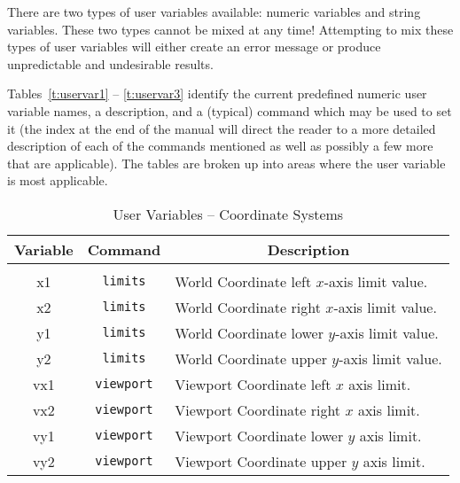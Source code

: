 There are two types of user variables available:
numeric variables and string variables.
These two types cannot be mixed at any time!
Attempting to mix these types of user variables will either create an
error message or produce unpredictable and undesirable results.

Tables~\ref{t:uservar1} -- \ref{t:uservar3}
identify the current predefined numeric user variable
names, a description,
and a (typical) command which may be used to set it
(the index at the end of the manual will direct the reader to a more
detailed description of each of the commands mentioned as well as
possibly a few more that are applicable).
The tables are broken up into areas where the user variable is most applicable.
\begin{table}
  \caption{User Variables -- Coordinate Systems}
  \centering
  \setlength{\tabentrylen}{\textwidth}
  \addtolength{\tabentrylen}{-1.6in}
  \begin{tabular}{|c|c|p{\tabentrylen}|} \hline\hline
    \multicolumn{1}{|c}{Variable}
    & \multicolumn{1}{|c|}{Command}
    & \multicolumn{1}{|c|}{Description} \\ \hline
    && \\
    x1     & {\tt limits}   & World Coordinate left $x$-axis limit value. \\
    x2     & {\tt limits}   & World Coordinate right $x$-axis limit value. \\
    y1     & {\tt limits}   & World Coordinate lower $y$-axis limit value. \\
    y2     & {\tt limits}   & World Coordinate upper $y$-axis limit value. \\
    vx1    & {\tt viewport} & Viewport Coordinate left $x$ axis limit. \\
    vx2    & {\tt viewport} & Viewport Coordinate right $x$ axis limit. \\
    vy1    & {\tt viewport} & Viewport Coordinate lower $y$ axis limit. \\
    vy2    & {\tt viewport} & Viewport Coordinate upper $y$ axis limit. \\

\end{tabular}
\end{table}
